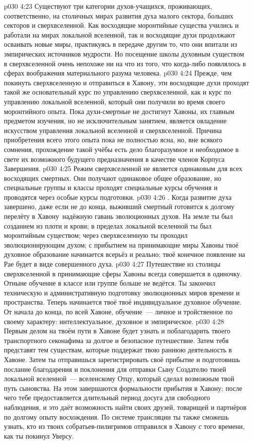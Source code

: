 \vs p030 4:23 Существуют три категории духов\hyp{}учащихся, проживающих, соответственно, на столичных мирах развития духа малого сектора, больших секторов и сверхвселенной. Как восходящие моронтийные существа учились и работали на мирах локальной вселенной, так и восходящие духи продолжают осваивать новые миры, практикуясь в передаче другим то, что они впитали из эмпирических источников мудрости. Но посещение школы духовным существом в сверхвселенной очень непохоже ни на что из того, что когда\hyp{}либо появлялось в сферах воображения материального разума человека.
\vs p030 4:24 Прежде, чем покинуть сверхвселенную и отправиться в Хавону, эти восходящие духи проходят такой же основательный курс по управлению сверхвселенной, как и курс по управлению локальной вселенной, который они получили во время своего моронтийного опыта. Пока духи\hyp{}смертные не достигнут Хавоны, их главным предметом изучения, но не исключительным занятием, является овладение искусством управления локальной вселенной и сверхвселенной. Причина приобретения всего этого опыта пока не полностью ясна, но, вне всякого сомнения, прохождение такой учёбы есть дело благоразумное и необходимое в свете их возможного будущего предназначения в качестве членов Корпуса Завершения.
\vs p030 4:25 Режим сверхвселенной не является одинаковым для всех восходящих смертных. Они получают одинаковое общее образование, но специальные группы и классы проходят специальные курсы обучения и проводятся через особые курсы подготовки.
\vs p030 4:26 . Когда развитие духа завершено, даже если не до конца, выживший смертный готовится к долгому перелёту в Хавону~надёжную гавань эволюционных духов. На земле ты был созданием из плоти и крови; в пределах локальной вселенной ты был моронтийным существом; через сверхвселенную ты проходил эволюционирующим духом; с прибытием на принимающие миры Хавоны твоё духовное образование начинается всерьёз и реально; твоё конечное появление на Рае будет в виде совершенного духа.
\vs p030 4:27 Путешествие из столицы сверхвселенной в принимающие сферы Хавоны всегда совершается в одиночку. Отныне обучение в классе или группе больше не ведётся. Ты закончил техническую и административную подготовку эволюционных миров времени и пространства. Теперь начинается твоё  твоё индивидуальное духовное обучение. От начала до конца, по всей Хавоне, обучение~--- личное и тройственное по своему характеру: интеллектуальное, духовное и эмпирическое.
\vs p030 4:28 Первым делом на твоём пути в Хавоне будет узнать и поблагодарить твоего транспортного секонафима за долгое и безопасное путешествие. Затем тебя представят тем существам, которые поддержат твою раннюю деятельность в Хавоне. Затем ты отправишься зарегистрировать своё прибытие и подготовишь послание благодарения и поклонения для отправки Сыну Создателю твоей локальной вселенной~--- вселенскому Отцу, который сделал возможным твой путь сыновства. На этом завершаются формальности прибытия в Хавону; после чего тебе предоставляется длительный период досуга для свободного наблюдения, и это даёт возможность найти своих друзей, товарищей и партнёров по долгому опыту восхождения. По системе трансляции ты также сможешь узнать, кто из твоих собратьев\hyp{}пилигримов отправился в Хавону с того времени, как ты покинул Уверсу.
